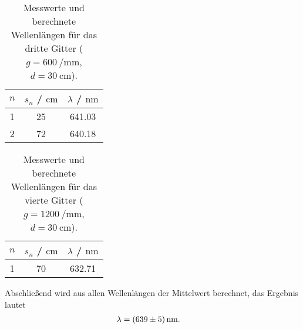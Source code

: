 \begin{table}[H]
  \centering
  \begin{tabular}{c|c|c}
    $n$ & $s_n$ / $\unit{\centi\metre}$& $\lambda$ / $\unit{\nano\metre}$ \\
    \hline
    1 & 25 & 641.03 \\
    2 & 72 & 640.18
  \end{tabular}
  \caption{Messwerte und berechnete Wellenlängen für das dritte Gitter ($g=\qty{600}{\per\milli\metre}$, $d=\qty{30}{\centi\metre}$).}
\label{tab:lambda3}
\end{table}
\begin{table}[H]
  \centering
  \begin{tabular}{c|c|c}
    $n$ & $s_n$ / $\unit{\centi\metre}$& $\lambda$ / $\unit{\nano\metre}$ \\
    \hline
    1 & 70 & 632.71 \\
  \end{tabular}
  \caption{Messwerte und berechnete Wellenlängen für das vierte Gitter ($g=\qty{1200}{\per\milli\metre}$, $d=\qty{30}{\centi\metre}$).}
\label{tab:lambda4}
\end{table}
Abschließend wird aus allen Wellenlängen der Mittelwert berechnet, das Ergebnis lautet
\begin{align*}
  \lambda &=\qty{639+-5}{\nano\metre}.
\end{align*}